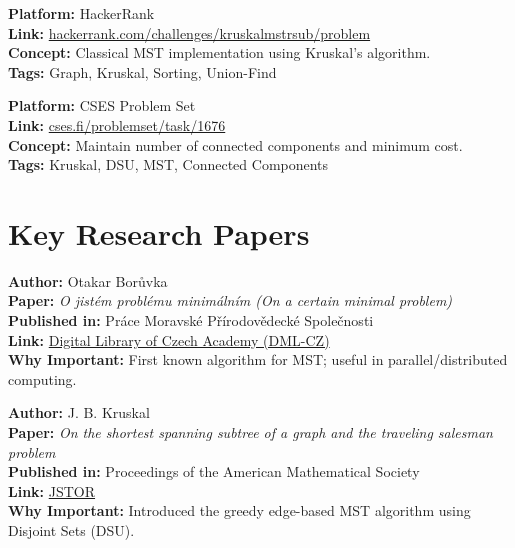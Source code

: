 \documentclass[14pt,a4paper]{extarticle}
\begin{document}
\begin{tcolorbox}[title=7. \textbf{Minimum Spanning Tree}]
\textbf{Platform:} HackerRank \\
\textbf{Link:} \href{https://www.hackerrank.com/challenges/kruskalmstrsub/problem}{hackerrank.com/challenges/kruskalmstrsub/problem} \\
\textbf{Concept:} Classical MST implementation using Kruskal’s algorithm. \\
\textbf{Tags:} Graph, Kruskal, Sorting, Union-Find
\end{tcolorbox}

\begin{tcolorbox}[title=8. \textbf{Road Construction}]
\textbf{Platform:} CSES Problem Set \\
\textbf{Link:} \href{https://cses.fi/problemset/task/1676}{cses.fi/problemset/task/1676} \\
\textbf{Concept:} Maintain number of connected components and minimum cost. \\
\textbf{Tags:} Kruskal, DSU, MST, Connected Components
\end{tcolorbox}

\newpage
\section{Key Research Papers}

\begin{tcolorbox}[title=1. Borůvka’s Algorithm (1926)]
\textbf{Author:} Otakar Borůvka \\
\textbf{Paper:} \textit{O jistém problému minimálním (On a certain minimal problem)} \\
\textbf{Published in:} Práce Moravské Přírodovědecké Společnosti \\
\textbf{Link:} \href{https://dml.cz/handle/10338.dmlcz/401613}{Digital Library of Czech Academy (DML-CZ)} \\
\textbf{Why Important:} First known algorithm for MST; useful in parallel/distributed computing.
\end{tcolorbox}

\begin{tcolorbox}[title=2. Kruskal’s Algorithm (1956)]
\textbf{Author:} J. B. Kruskal \\
\textbf{Paper:} \textit{On the shortest spanning subtree of a graph and the traveling salesman problem} \\
\textbf{Published in:} Proceedings of the American Mathematical Society \\
\textbf{Link:} \href{https://www.jstor.org/stable/2033241}{JSTOR} \\
\textbf{Why Important:} Introduced the greedy edge-based MST algorithm using Disjoint Sets (DSU).
\end{tcolorbox}
\end{document}
